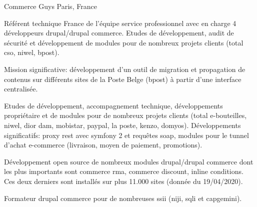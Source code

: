 \cventry
{} %
{Commerce Guys} %
{Paris, France} %
{} %
{
\begin{cvsubentries}
    \begin{cvitems} %
        \item
        {
            Référent technique France de l'équipe service professionnel avec en charge 4
            développeurs drupal/drupal commerce. Etudes de développement, audit de sécurité et
            développement de modules pour de nombreux projets clients (total cso, niwel, bpost).
        }
        \item
        {
            Mission significative: développement d'un outil de migration et propagation de contenus
            sur différents sites de la Poste Belge (bpost) à partir d'une interface centralisée.
        }
    \end{cvitems}
    \begin{cvitems} %
        \item
        {
            Etudes de développement, accompagnement technique, développements propriétaire et de modules
            pour de nombreux projets clients (total e-bouteilles, niwel, dior dam, mobistar, paypal, 
            la poste, kenzo, domyos). Développements significatifs: proxy rest avec symfony 2 et 
            requêtes soap, modules pour le tunnel d'achat e-commerce (livraison, moyen de paiement, promotions).
        }
        \item
        {
            Développement open source de nombreux modules drupal/drupal commerce dont les plus importants sont
            commerce rma, commerce discount, inline conditions. Ces deux derniers sont installés sur plus 11.000
            sites (donnée du 19/04/2020).
        }
        \item
        {
            Formateur drupal commerce pour de nombreuses ssii (niji, sqli et capgemini).
        }
    \end{cvitems}
\end{cvsubentries}
}

